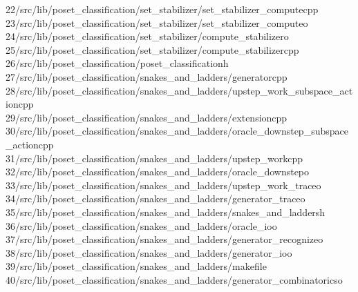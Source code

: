 \begin{tabbing}
22\>/src/lib/poset\_classification/set\_stabilizer/set\_stabilizer\_computecpp\\[0pt]
23\>/src/lib/poset\_classification/set\_stabilizer/set\_stabilizer\_computeo\\[0pt]
24\>/src/lib/poset\_classification/set\_stabilizer/compute\_stabilizero\\[0pt]
25\>/src/lib/poset\_classification/set\_stabilizer/compute\_stabilizercpp\\[0pt]
26\>/src/lib/poset\_classification/poset\_classificationh\\[0pt]
27\>/src/lib/poset\_classification/snakes\_and\_ladders/generatorcpp\\[0pt]
28\>/src/lib/poset\_classification/snakes\_and\_ladders/upstep\_work\_subspace\_actioncpp\\[0pt]
29\>/src/lib/poset\_classification/snakes\_and\_ladders/extensioncpp\\[0pt]
30\>/src/lib/poset\_classification/snakes\_and\_ladders/oracle\_downstep\_subspace\_actioncpp\\[0pt]
31\>/src/lib/poset\_classification/snakes\_and\_ladders/upstep\_workcpp\\[0pt]
32\>/src/lib/poset\_classification/snakes\_and\_ladders/oracle\_downstepo\\[0pt]
33\>/src/lib/poset\_classification/snakes\_and\_ladders/upstep\_work\_traceo\\[0pt]
34\>/src/lib/poset\_classification/snakes\_and\_ladders/generator\_traceo\\[0pt]
35\>/src/lib/poset\_classification/snakes\_and\_ladders/snakes\_and\_laddersh\\[0pt]
36\>/src/lib/poset\_classification/snakes\_and\_ladders/oracle\_ioo\\[0pt]
37\>/src/lib/poset\_classification/snakes\_and\_ladders/generator\_recognizeo\\[0pt]
38\>/src/lib/poset\_classification/snakes\_and\_ladders/generator\_ioo\\[0pt]
39\>/src/lib/poset\_classification/snakes\_and\_ladders/makefile\\[0pt]
40\>/src/lib/poset\_classification/snakes\_and\_ladders/generator\_combinatoricso\\[0pt]

\end{tabbing}
